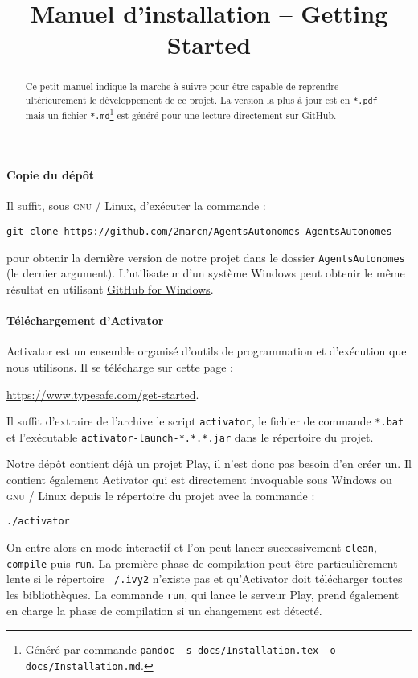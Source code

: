 \documentclass[11pt]{article}
\title{Manuel d'installation -- \foreignlanguage{british}{Getting Started}}
\begin{document}
\maketitle
\setcounter{tocdepth}{4}
\tableofcontents

\begin{abstract}
Ce petit manuel indique la marche à suivre pour être capable de reprendre ultérieurement le développement de ce projet. La version la plus à jour est en \texttt{*.pdf} mais un fichier \texttt{*.md}\footnote{Généré par commande \texttt{pandoc -s docs/Installation.tex -o docs/Installation.md}.} est généré pour une lecture directement sur GitHub.
\end{abstract}

\paragraph{Copie du dépôt} Il suffit, sous \textsc{gnu} / Linux, d'exécuter la commande :
\begin{center}\texttt{git clone https://github.com/2marcn/AgentsAutonomes AgentsAutonomes}\end{center}
pour obtenir la dernière version de notre projet dans le dossier \texttt{AgentsAutonomes} (le dernier argument). L'utilisateur d'un système Windows peut obtenir le même résultat en utilisant \href{https://windows.github.com/}{GitHub for Windows}.

\paragraph{Téléchargement d'Activator}

Activator est un ensemble organisé d'outils de programmation et d'exécution que nous utilisons. Il se télécharge sur cette page : \begin{center}\url{https://www.typesafe.com/get-started}.\end{center}Il suffit d'extraire de l'archive le script \texttt{activator}, le fichier de commande \texttt{*.bat} et l'exécutable \texttt{activator-launch-*.*.*.jar} dans le répertoire du projet.

Notre dépôt contient déjà un projet Play, il n'est donc pas besoin d'en créer un. Il contient également Activator qui est directement invoquable sous Windows ou \textsc{gnu} / Linux depuis le répertoire du projet avec la commande : 
\begin{center}\texttt{./activator}\end{center} On entre alors en mode interactif et l'on peut lancer successivement \texttt{clean}, \texttt{compile} puis \texttt{run}. La première phase de compilation peut être particulièrement lente si le répertoire \texttt{~/.ivy2} n'existe pas et qu'Activator doit télécharger toutes les bibliothèques. La commande \texttt{run}, qui lance le serveur Play, prend également en charge la phase de compilation si un changement est détecté.
\end{document}
